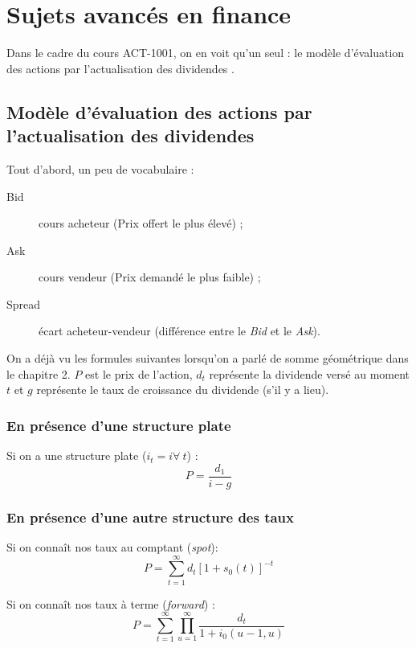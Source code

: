 \documentclass[12pt, french]{report}
\begin{document}
\setcounter{chapter}{8}
\chapter{Sujets avancés en finance}
Dans le cadre du cours ACT-1001, on en voit qu'un seul : le modèle d'évaluation
des actions par l'actualisation des dividendes
.

\section{Modèle d'évaluation des actions par l'actualisation des dividendes}
Tout d'abord, un peu de vocabulaire :
\begin{description}
	\item[Bid] cours acheteur (Prix offert le plus élevé) ;
	\item[Ask] cours vendeur (Prix demandé le plus faible) ;
	\item[Spread] écart acheteur-vendeur (différence entre le \emph{Bid} et le \emph{Ask}).
\end{description}
On a déjà vu les formules suivantes lorsqu'on a parlé de somme géométrique dans
le chapitre 2. $P$ est le prix de l'action, $d_t$ représente la dividende versé
au moment $t$ et $g$ représente le taux de croissance du dividende (s'il y a lieu).
\p
\subsection*{En présence d'une structure plate}

Si on a une structure plate ($i_t = i \forall\ t$) :
\begin{equation}
	P = \frac{d_1}{i - g}
\end{equation}

\subsection*{En présence d'une autre structure des taux}
Si on connaît nos taux au comptant (\emph{spot}):
\begin{equation}
	P = \sum_{t=1}^\infty d_t [1 + s_0(t)]^{-t}
\end{equation}

Si on connaît nos taux à terme (\emph{forward}) :
\begin{equation}
	P = \sum_{t=1}^\infty \prod_{u=1}^\infty \frac{d_t}{1 + i_0(u-1,u)}
\end{equation}







\end{document}
